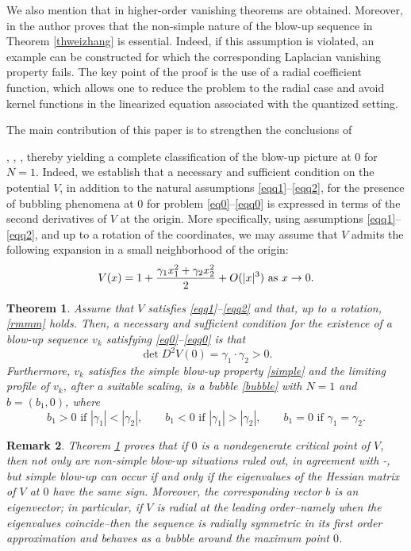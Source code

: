 \documentclass[reqno,11pt]{amsart}
\newtheorem{thm}{Theorem}[section]
\newtheorem{rmk}[thm]{Remark}
\theoremstyle{definition}
\numberwithin{equation}{section}
\renewcommand{\(}{\left(}
\renewcommand{\)}{\right)}
\renewcommand{\[}{\left[}
\renewcommand{\]}{\right]}
\newcommand{\beq}{\begin{equation}}
\newcommand{\eeq}{\end{equation}}
\begin{document}
We also mention that  in \cite{WeiZhang4} higher-order vanishing theorems are obtained. Moreover, in \cite{linawu} the author  proves that the non-simple nature of the blow-up sequence in Theorem \ref{thweizhang} is essential. Indeed, if this assumption is violated, an example can be constructed for which the corresponding Laplacian vanishing property fails. The key point of the proof is the use of a radial coefficient function, which allows one to reduce the problem to the radial case and avoid kernel functions in the linearized equation associated with the quantized setting. 

The main contribution of this paper is to strengthen the conclusions of {\cite{WeiZhang4}, \cite{WeiZhang2}, \cite{linawu}, thereby  yielding a  complete classification 
of the blow-up picture at $0$ for $N=1$. 
Indeed, we establish that  a necessary and sufficient condition on the potential $V$, in addition to the natural assumptions \eqref{eqq1}--\eqref{eqq2}, for the presence of 
bubbling phenomena at $0$ for problem \eqref{eq0}--\eqref{eqq0} is expressed in terms of the second derivatives of $V$ 
 at the origin.
More specifically, using assumptions \eqref{eqq1}–\eqref{eqq2}, and up to a rotation of the coordinates, we may assume that $V$ admits the following expansion in a small neighborhood of the origin: \beq\label{rmmm}V(x)=1+ \frac{\gamma_1 x_1^2+\gamma_2 x_2^2}{2}+O(|x|^3) \hbox{ as }x\to 0.\eeq


\begin{thm}\label{th1} Assume that 
$V$ satisfies \eqref{eqq1}--\eqref{eqq2} and that, up to a rotation, \eqref{rmmm} holds. 
Then, a necessary and sufficient condition for the existence of a  blow-up sequence  $v_k$   satisfying \eqref{eq0}--\eqref{eqq0}
is that \beq\label{pot}\operatorname{det}D^2 V(0)=\gamma_1\cdot\gamma_2>0.
\eeq
 Furthermore, $v_k$ satisfies the simple blow-up property \eqref{simple} and the limiting profile of $v_k$, after a suitable scaling, is a bubble \eqref{bubble} with $N=1$ and  $b=
 (b_1,0) $, where $$b_1>0 \text{ if } |\gamma_1|<|\gamma_2|,\qquad
b_1<0 \text{ if } |\gamma_1|>|\gamma_2|,\qquad
b_1=0 \text{ if } \gamma_1=\gamma_2.
$$ 
\end{thm}

\begin{rmk}\label{th1rem} Theorem \ref{th1} proves that if $0$ is a nondegenerate critical point of $V$, then  not only are  non-simple blow-up situations   ruled out, in agreement with  \cite{WeiZhang4}-\cite{WeiZhang2}, but  simple blow-up can occur if and  only if the  eigenvalues of  the Hessian matrix of $V$ at $0$  have the same sign. Moreover, the corresponding vector $b$ is an eigenvector;
 in particular, if $V$ is radial at the leading order--namely when the eigenvalues coincide--then  the sequence is radially symmetric in its first order approximation and behaves as a  bubble around the maximum point $0$.
\end{rmk}


}
\end{document}
